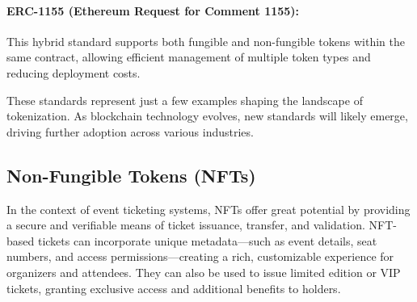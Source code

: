 \paragraph{ERC-1155 (Ethereum Request for Comment 1155):}
This hybrid standard supports both fungible and non-fungible tokens within the
same contract, allowing efficient management of multiple token types and
reducing deployment costs.

These standards represent just a few examples shaping the landscape of
tokenization. As blockchain technology evolves, new standards will likely
emerge, driving further adoption across various industries.

\subsection{Non-Fungible Tokens (NFTs)}
\label{subsec:nfts}

In the context of event ticketing systems, NFTs offer great potential by
providing a secure and verifiable means of ticket issuance, transfer, and
validation. NFT-based tickets can incorporate unique metadata—such as event
details, seat numbers, and access permissions—creating a rich, customizable
experience for organizers and attendees. They can also be used to issue limited
edition or VIP tickets, granting exclusive access and additional benefits to
holders.
